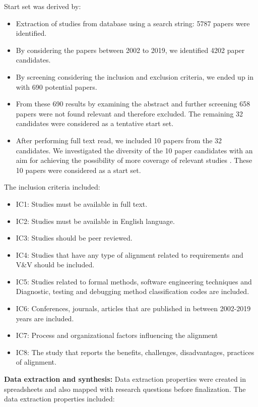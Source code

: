 \documentclass{article}
\begin{document}
Start set was derived by:
\begin{itemize}
    \item Extraction of studies from database using a search string: 5787 papers were identified.
    \item By considering the papers between 2002 to 2019, we identified 4202 paper candidates.
    \item By screening considering the inclusion and exclusion criteria, we ended up in with 690 potential papers.
    \item From these 690 results by examining the abstract and further screening 658 papers were not found relevant and therefore excluded. The remaining 32 candidates were considered as a tentative start set.
    \item After performing full text read, we included 10 papers from the 32 candidates. We investigated the diversity of the 10 paper candidates with an aim for achieving the possibility of more coverage of relevant studies \cite{wohlin2014guidelines}. These 10 papers were considered as a start set. 
\end{itemize}
The inclusion criteria included:
\begin{itemize}
    \item IC1: Studies must be available in full text.
    \item IC2: Studies must be available in English language.
    \item IC3: Studies should be peer reviewed.
    \item IC4: Studies that have any type of alignment related to requirements and   V\&V should be included.
    \item IC5: Studies related to formal methods, software engineering techniques and Diagnostic, testing and debugging method classification codes are included.
    \item IC6: Conferences, journals, articles that are published in between 2002-2019 years are included.
    \item IC7: Process and organizational factors influencing the alignment 
    \item IC8: The study that reports the benefits, challenges, disadvantages, practices of alignment.

\end{itemize}

\textbf{Data extraction and synthesis:} Data extraction properties were created in spreadsheets and also mapped with research questions before finalization. The data extraction properties included: 
\end{document}
